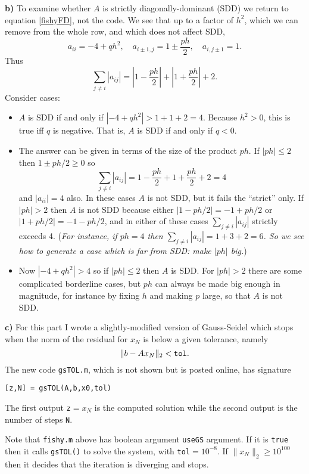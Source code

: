 \documentclass[11pt]{amsart}
\newcommand{\epart}[1]{\medskip\noindent\textbf{#1)}}
\begin{document}
\epart{b}  To examine whether $A$ is strictly diagonally-dominant (SDD) we return to equation \eqref{fishyFD}, not the code.  We see that up to a factor of $h^2$, which we can remove from the whole row, and which does not affect SDD,
    $$a_{ii} = -4 + q h^2, \quad a_{i\pm 1,j} = 1 \pm \frac{ph}{2}, \quad a_{i,j\pm 1} = 1.$$
Thus
    $$\sum_{j\ne i} |a_{ij}| = \left|1 - \frac{ph}{2}\right| + \left|1 + \frac{ph}{2}\right| + 2.$$
Consider cases:

\begin{itemize}
\item[\fbox{$p=0$}]  $A$ is SDD if and only if $|-4+q h^2| > 1 + 1 + 2 = 4$.  Because $h^2>0$, this is true iff $q$ is negative.  That is, $A$ is SDD if and only if $q < 0$.

\item[\fbox{$q=0$}]  The answer can be given in terms of the size of the product $ph$.  If $|ph| \le 2$ then $1\pm ph/2 \ge 0$ so
    $$\sum_{j\ne i} |a_{ij}| = 1 - \frac{ph}{2} + 1 + \frac{ph}{2} + 2 = 4$$
and $|a_{ii}|=4$ also.  In these cases $A$ is not SDD, but it fails the ``strict'' only.  If $|ph| > 2$ then $A$ is not SDD because either $|1-ph/2| = -1 + ph/2$ or $|1+ph/2|=-1-ph/2$, and in either of these cases $\sum_{j\ne i} |a_{ij}|$ strictly exceeds 4.  (\emph{For instance, if $ph=4$ then $\sum_{j\ne i} |a_{ij}| = 1 + 3 + 2 = 6$.  So we see how to generate a case which is far from SDD: make $|ph|$ big.})

\item[\fbox{$q = -1$}]  Now $|-4+qh^2|>4$ so if $|ph| \le 2$ then $A$ is SDD.  For $|ph|>2$ there are some complicated borderline cases, but $ph$ can always be made big enough in magnitude, for instance by fixing $h$ and making $p$ large, so that $A$ is not SDD.
\end{itemize}

\epart{c}  For this part I wrote a slightly-modified version of Gauss-Seidel which stops when the norm of the residual for $x_N$ is below a given tolerance, namely
    $$\|b - A x_N\|_2 < \text{\texttt{tol}}.$$
The new code \texttt{gsTOL.m}, which is not shown but is posted online, has signature
\begin{center}
\verb|[z,N] = gsTOL(A,b,x0,tol)|
\end{center}
The first output \texttt{z}$=x_N$ is the computed solution while the second output is the number of steps \texttt{N}.

Note that \texttt{fishy.m} above has boolean argument \texttt{useGS} argument.  If it is \texttt{true} then it calls \texttt{gsTOL()} to solve the system, with \texttt{tol}$=10^{-8}$.  If $\|x_N\|_2 \ge 10^{100}$ then it decides that the iteration is diverging and stops.
\end{document}
